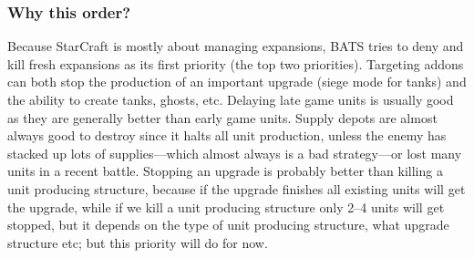 \subsubsection{Why this order?}
Because StarCraft is mostly about managing expansions\cite{day9}, BATS tries to deny and kill fresh expansions as its first priority (the top two priorities). Targeting addons can both stop the production of an important upgrade (siege mode for tanks) and the ability to create tanks, ghosts, etc. Delaying late game units is usually good as they are generally better than early game units. Supply depots are almost always good to destroy since it halts all unit production, unless the enemy has stacked up lots of supplies—which almost always is a bad strategy—or lost many units in a recent battle. Stopping an upgrade is probably better than killing a unit producing structure, because if the upgrade finishes all existing units will get the upgrade, while if we kill a unit producing structure only 2–4 units will get stopped, but it depends on the type of unit producing structure, what upgrade structure etc; but this priority will do for now.
